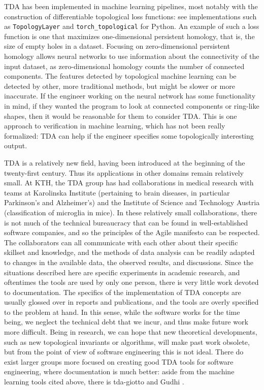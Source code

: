 \documentclass[11pt, oneside]{article}
\begin{document}
TDA has been implemented in machine learning pipelines, most notably with the construction of differentiable topological loss functions: see implementations such as \verb|TopologyLayer| \cite{GNDS2020} and \verb|torch_topological| \cite{HMR2021} for Python. An example of such a loss function is one that maximizes one-dimensional persistent homology, that is, the size of empty holes in a dataset. Focusing on zero-dimensional persistent homology allows neural networks to use information about the connectivity of the input dataset, as zero-dimensional homology counts the number of connected components. The features detected by topological machine learning can be detected by other, more traditional methods, but might be slower or more inaccurate. If the engineer working on the neural network has some functionality in mind, if they wanted the program to look at connected components or ring-like shapes, then it would be reasonable for them to consider TDA. This is one approach to verification in machine learning, which has not been really formalized: TDA can help if the engineer specifies some topologically interesting output.

TDA is a relatively new field, having been introduced at the beginning of the twenty-first century. Thus its applications in other domains remain relatively small. At KTH, the TDA group has had collaborations in medical research with teams at Karolinska Institute (pertaining to brain diseases, in particular Parkinson’s and Alzheimer’s) and the Institute of Science and Technology Austria (classification of microglia in mice). In these relatively small collaborations, there is not much of the technical bureaucracy that can be found in well-established software companies, and so the principles of the Agile manifesto can be respected. The collaborators can all communicate with each other about their specific skillset and knowledge, and the methods of data analysis can be readily adapted to changes in the available data, the observed results, and discussions. Since the situations described here are specific experiments in academic research, and oftentimes the tools are used by only one person, there is very little work devoted to documentation. The specifics of the implementation of TDA concepts are usually glossed over in reports and publications, and the tools are overly specified to the problem at hand. In this sense, while the software works for the time being, we neglect the technical debt that we incur, and thus make future work more difficult. Being in research, we can hope that new theoretical developments, such as new topological invariants or algorithms, will make past work obsolete, but from the point of view of software engineering this is not ideal. There do exist larger groups more focused on creating good TDA tools for software engineering, where documentation is much better: aside from the machine learning tools cited above, there is tda-giotto \cite{TLTPCMDH2021} and Gudhi \cite{MBGY2014}.\\
\end{document}
